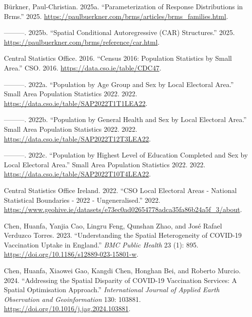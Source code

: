 \documentclass{article}
\newlength{\cslhangindent}
\newenvironment{CSLReferences}[2] %
 {\begin{list}{}{%
  \setlength{\itemindent}{0pt}
  \setlength{\leftmargin}{0pt}
  \setlength{\parsep}{0pt}
  \ifodd #1
   \setlength{\leftmargin}{\cslhangindent}
   \setlength{\itemindent}{-1\cslhangindent}
  \fi
  \setlength{\itemsep}{#2\baselineskip}}}
 {\end{list}}
\begin{document}
\label{refs}
\begin{CSLReferences}{1}{0}
Bürkner, Paul-Christian. 2025a. {``Parameterization of {Response}
{Distributions} in Brms.''} 2025.
\url{https://paulbuerkner.com/brms/articles/brms_families.html}.

---------. 2025b. {``Spatial Conditional Autoregressive ({CAR})
Structures.''} 2025.
\url{https://paulbuerkner.com/brms/reference/car.html}.

Central Statistics Office. 2016. {``Census 2016: Population Statistics
by Small Area.''} CSO. 2016. \url{https://data.cso.ie/table/CDC47}.

---------. 2022a. {``Population by Age Group and Sex by Local Electoral
Area.''} Small Area Population Statistics 2022. 2022.
\url{https://data.cso.ie/table/SAP2022T1T1LEA22}.

---------. 2022b. {``Population by General Health and Sex by Local
Electoral Area.''} Small Area Population Statistics 2022. 2022.
\url{https://data.cso.ie/table/SAP2022T12T3LEA22}.

---------. 2022c. {``Population by Highest Level of Education Completed
and Sex by Local Electoral Area.''} Small Area Population Statistics
2022. 2022. \url{https://data.cso.ie/table/SAP2022T10T4LEA22}.

Central Statistics Office Ireland. 2022. {``{CSO} {Local} {Electoral}
{Areas} - {National} {Statistical} {Boundaries} - 2022 -
{Ungeneralised}.''} 2022.
\url{https://www.geohive.ie/datasets/e73ec0ad02654778adca35fa86b24a5f_3/about}.

Chen, Huanfa, Yanjia Cao, Lingru Feng, Qunshan Zhao, and José Rafael
Verduzco Torres. 2023. {``Understanding the Spatial Heterogeneity of
{COVID}-19 Vaccination Uptake in {England}.''} \emph{BMC Public Health}
23 (1): 895. \url{https://doi.org/10.1186/s12889-023-15801-w}.

Chen, Huanfa, Xiaowei Gao, Kangdi Chen, Honghan Bei, and Roberto Murcio.
2024. {``Addressing the Spatial Disparity of COVID-19 Vaccination
Services: A Spatial Optimisation Approach.''} \emph{International
Journal of Applied Earth Observation and Geoinformation} 130: 103881.
\url{https://doi.org/10.1016/j.jag.2024.103881}.


\end{CSLReferences}
\end{document}
